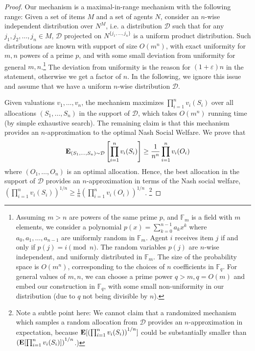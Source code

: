 \documentclass{article}
\newcommand{\eps}{\varepsilon}
\newcommand{\FF}{\mathbb F}
\newcommand{\E}{\mbox{\bf E}}
\newcommand{\cD}{{\mathcal D}}
\begin{document}
\begin{proof}
Our mechanism is a maximal-in-range mechanism with the following range: Given a set of items $M$ and a set of agents $N$, consider an $n$-wise independent distribution over $N^M$, i.e. a distribution $\cD$ such that for any $j_1,j_2,\ldots,j_n \in M$, $\cD$ projected on $N^{\{j_1,\ldots,j_n\}}$ is a uniform product distribution. Such distributions are known with support of size $O(m^n)$, with exact uniformity for $m,n$ powers of a prime $p$, and with some small deviation from uniformity for general $m,n$.\footnote{Assuming $m > n$ are powers of the same prime $p$, and $\FF_m$ is a field with $m$ elements, we consider a polynomial $p(x) = \sum_{k=0}^{n-1} a_k x^k$ where $a_0,a_1,\ldots,a_{n-1}$ are uniformly random in $\FF_m$. Agent $i$ receives item $j$ if and only if $p(j) = i \pmod n$. The random variables $p(j)$ are $n$-wise independent, and uniformly distributed in $\FF_m$. The size of the probability space is $O(m^n)$, corresponding to the choices of $n$ coefficients in $\FF_q$. For general values of $m,n$, we can choose a prime power $q > m, q = O(m)$ and embed our construction in $\FF_q$, with some small non-uniformity in our distribution (due to $q$ not being divisible by $n$).}
The deviation from uniformity is the reason for $(1+\eps)n$ in the statement, otherwise we get a factor of $n$. In the following, we ignore this issue and assume that we have a uniform $n$-wise distribution $\cD$. 

Given valuations $v_1,\ldots,v_n$, the mechanism maximizes $\prod_{i=1}^{n} v_i(S_i)$ over all allocations $(S_1,\ldots,S_n)$ in the support of $\cD$, which takes $O(m^n)$ running time (by simple exhaustive search). The remaining claim is that this mechanism provides an $n$-approximation to the optimal Nash Social Welfare. We prove that
\begin{equation}
\label{eq:n-approx}
\E_{(S_1,\ldots,S_n) \sim \cD}\left[\prod_{i=1}^{n} v_i(S_i) \right] \geq \frac{1}{n^n} \prod_{i=1}^{n} v_i(O_i)
\end{equation}
where $(O_1,\ldots,O_n)$ is an optimal allocation. Hence, the best allocation in the support of $\cD$ provides an $n$-approximation in terms of the Nash social welfare, $\left( \prod_{i=1}^{n} v_i(S_i) \right)^{1/n} \geq \frac{1}{n} \left( \prod_{i=1}^{n} v_i(O_i) \right)^{1/n}$. \footnote{Note a subtle point here: We cannot claim that a randomized mechanism which samples a random allocation from $\cD$ provides an $n$-approximation in expectation, because $\E[\left( \prod_{i=1}^{n} v_i(S_i) \right)^{1/n}]$ could be substantially smaller than $\left( \E[\prod_{i=1}^{n} v_i(S_i)] \right)^{1/n}$.)}


\end{proof}
\end{document}
